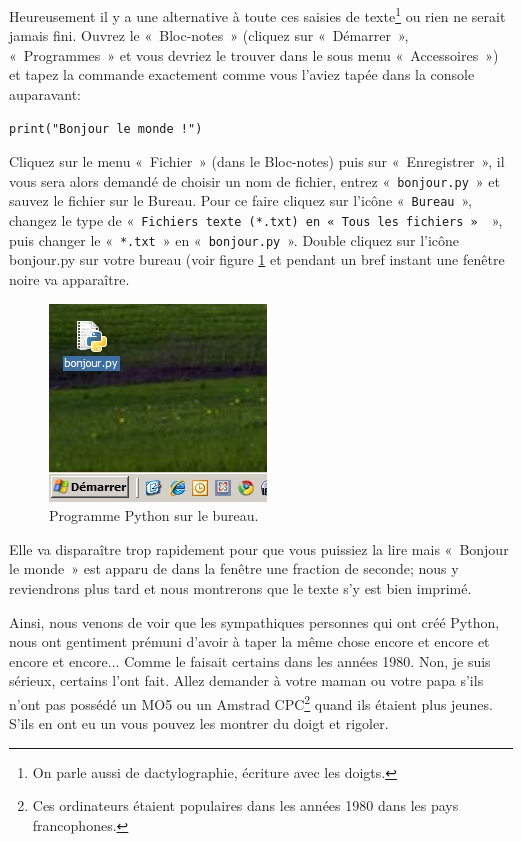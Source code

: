 Heureusement il y a une alternative à toute ces saisies de texte\footnote{On parle aussi de dactylographie, écriture avec les doigts.} ou rien ne serait jamais fini.
Ouvrez le «~Bloc-notes~» (cliquez sur «~Démarrer~», «~Programmes~» et vous devriez le trouver dans le sous menu «~Accessoires~») et tapez la commande exactement comme vous l'aviez tapée dans la console auparavant:

\begin{Verbatim}[frame=single,rulecolor=\color{gray}, label=ne pas saisir]
print("Bonjour le monde !")
\end{Verbatim}
\rm

Cliquez sur le menu «~Fichier~» (dans le Bloc-notes) puis sur «~Enregistrer~», il vous sera alors demandé de choisir un nom de fichier, entrez «~\texttt{bonjour.py}~» et sauvez le fichier sur le Bureau. Pour ce faire cliquez sur l'icône «~\texttt{Bureau}~», changez le type de «~\texttt{Fichiers texte (*.txt) en «~\texttt{Tous les fichiers}~» }~», puis changer le «~\texttt{*.txt}~» en «~\texttt{bonjour.py}~». Double cliquez sur l'icône bonjour.py sur votre bureau (voir figure \ref{fig:bureau} et pendant un bref instant une fenêtre noire va apparaître.

\begin{figure}[h!]
\centering
\includegraphics[scale=0.6]{images/bureau}
\caption{Programme Python sur le bureau.}\label{fig:bureau}
\end{figure}

Elle va disparaître trop rapidement pour que vous puissiez la lire mais «~Bonjour le monde~» est apparu de dans la fenêtre une fraction de seconde; nous y reviendrons plus tard et nous montrerons que le texte s'y est bien imprimé.

Ainsi, nous venons de voir que les sympathiques personnes qui ont créé Python, nous ont gentiment prémuni d'avoir à taper la même chose encore et encore et encore et encore... Comme le faisait certains dans les années 1980. Non, je suis sérieux, certains l'ont fait. Allez demander à votre maman ou votre papa s'ils n'ont pas possédé un MO5 ou un Amstrad CPC\footnote{Ces ordinateurs étaient populaires dans les années 1980 dans les pays francophones.} quand ils étaient plus jeunes. S'ils en ont eu un vous pouvez les montrer du doigt et rigoler.\\


